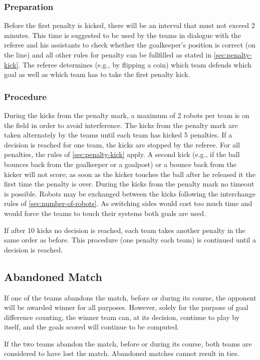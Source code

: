 \subsubsection{Preparation}
Before the first penalty is kicked, there will be an interval that must not exceed 2 minutes.
This time is suggested to be used by the teams in dialogue with the referee and his assistants to check whether the goalkeeper's position is correct (on the line) and all other rules for penalty can be fullfilled as stated in \autoref{sec:penalty-kick}.
The referee determines (e.g., by flipping a coin) which team defends which goal as well as which team has to take the first penalty kick.

\subsubsection{Procedure}
During the kicks from the penalty mark, a maximum of 2 robots per team is on the field in order to avoid interference.
The kicks from the penalty mark are taken alternately by the teams until each team has kicked 5 penalties.
If a decision is reached for one team, the kicks are stopped by the referee.
For all penalties, the rules of \autoref{sec:penalty-kick} apply.
A second kick (e.g., if the ball bounces back from the goalkeeper or a goalpost) or a bounce back from the kicker will not score; as soon as the kicker touches the ball after he released it the first time the penalty is over.
During the kicks from the penalty mark no timeout is possible.
Robots may be exchanged between the kicks following the interchange rules of \autoref{sec:number-of-robots}.
As switching sides would cost too much time and would force the teams to touch their systems both goals are used.

If after 10 kicks no decision is reached, each team takes another penalty in the same order as before.
This procedure (one penalty each team) is continued until a decision is reached.

\subsection{Abandoned Match}
If one of the teams abandons the match, before or during its course, the opponent will be awarded winner for all purposes.
However, solely for the purpose of goal difference counting, the winner team can, at its decision, continue to play by itself, and the goals scored will continue to be computed.

If the two teams abandon the match, before or during its course, both teams are considered to have lost the match.
Abandoned matches cannot result in ties.

